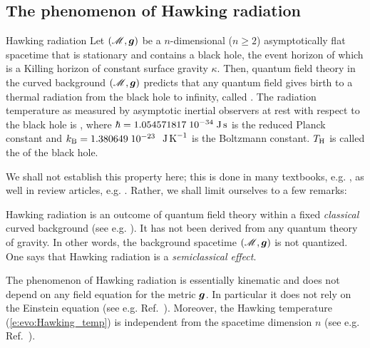 \subsection{The phenomenon of Hawking radiation} \label{s:evo:Hawking_rad}

\begin{tprop}{Hawking radiation}{}
Let $(\mathscr{M},\bm{g})$ be a $n$-dimensional ($n\geq 2$) asymptotically flat
spacetime that is stationary and contains a black hole, the event horizon
of which is a Killing horizon of constant surface gravity $\kappa$.
Then, quantum field theory in the curved background $(\mathscr{M},\bm{g})$
predicts that any quantum field gives birth to a thermal radiation
from the black hole to infinity, called
. The radiation temperature
as measured by asymptotic inertial observers at rest with respect to the black hole
is
\be \label{e:evo:Hawking_temp}
     ,
\ee
where $\hbar = 1.054571817\; 10^{-34} {\rm\; J\, s}$ is the reduced Planck constant and
$k_{\rm B} = 1.380649\; 10^{-23}$ ${\rm\;  J\, K}^{-1}$ is the Boltzmann constant. $T_{\rm H}$ is called the
 of the black hole.
\end{tprop}

We shall not establish this property here; this is done in many textbooks,
e.g. \cite{Wald84,Wald94,FroloN98,Carro04,FabbrN05}, as well in review
articles, e.g. \cite{BroutMPS95,Damou04,Jacob96,Jacob05}. Rather, we shall limit
ourselves to a few remarks:


\begin{remark}
Hawking radiation is an outcome of quantum field theory within a fixed \emph{classical} curved background
(see e.g. \cite{Wald94}). It has not been derived from any quantum theory of gravity.
In other words, the background spacetime $(\mathscr{M},\bm{g})$ is not quantized. One says that Hawking radiation is
a \emph{semiclassical effect}.
\end{remark}

\begin{remark} \label{r:evo:Hawking_rad_kinematic}
The phenomenon of Hawking radiation is essentially kinematic and does not depend on any field equation for the
metric $\bm{g}$. In particular it does not rely on the Einstein equation
(see e.g. Ref.~\cite{Visse98}).
Moreover, the Hawking temperature (\ref{e:evo:Hawking_temp}) is independent from the spacetime dimension
$n$ (see e.g. Ref.~\cite{KantiW15}).
\end{remark}


